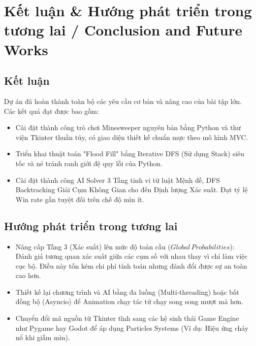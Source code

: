 \section{Kết luận \& Hướng phát triển trong tương lai / Conclusion and Future Works}

\subsection{Kết luận}
Dự án đã hoàn thành toàn bộ các yêu cầu cơ bản và nâng cao của bài tập lớn. Các kết quả đạt được bao gồm:
\begin{itemize}
    \item Cài đặt thành công trò chơi Minesweeper nguyên bản bằng Python và thư viện Tkinter thuần túy, có giao diện thiết kế chuẩn mực theo mô hình MVC.
    \item Triển khai thuật toán "Flood Fill" bằng Iterative DFS (Sử dụng Stack) siêu tốc và né tránh ranh giới đệ quy lỗi của Python.
    \item Cài đặt thành công AI Solver 3 Tầng tinh vi từ luật Mệnh đề, DFS Backtracking Giải Cụm Không Gian cho đến Định lượng Xác suất. Đạt tỷ lệ Win rate gần tuyệt đối trên chế độ mìn ít.
\end{itemize}

\subsection{Hướng phát triển trong tương lai}
\begin{itemize}
    \item Nâng cấp Tầng 3 (Xác suất) lên mức độ toàn cầu ($Global\, Probabilities$): Đánh giá tương quan xác suất giữa các cụm số với nhau thay vì chỉ làm việc cục bộ. Điều này tốn kém chi phí tính toán nhưng đánh đổi được sự an toàn cao hơn.
    \item Thiết kế lại chương trình và AI bằng đa luồng (Multi-threading) hoặc bất đồng bộ (Asyncio) để Animation chạy tác tử chạy song song mượt mà hơn.
    \item Chuyển đổi mã nguồn từ Tkinter tĩnh sang các hệ sinh thái Game Engine như Pygame hay Godot để áp dụng Particles Systems (Ví dụ: Hiệu ứng cháy nổ khi giẫm mìn).
\end{itemize}
